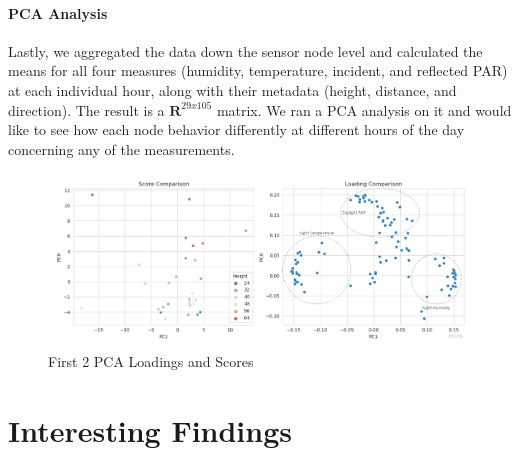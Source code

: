 \documentclass[11pt, letterpaper]{article}
\begin{document}
\paragraph{PCA Analysis}
Lastly, we aggregated the data down the sensor node level and calculated the means for all four measures (humidity, temperature, incident, and reflected PAR) at each individual hour, along with their metadata (height, distance, and direction). The result is a $\mathbf{R}^{29x105}$ matrix. We ran a PCA analysis on it and would like to see how each node behavior differently at different hours of the day concerning any of the measurements.
\begin{figure}[h!]
\centering
\includegraphics[width=1.0\textwidth]{eda_3.6.jpg}
\captionsetup{justification=centering}
\caption{First 2 PCA Loadings and Scores}
\label{fig:pca}
\end{figure}


\section{Interesting Findings}
\end{document}
